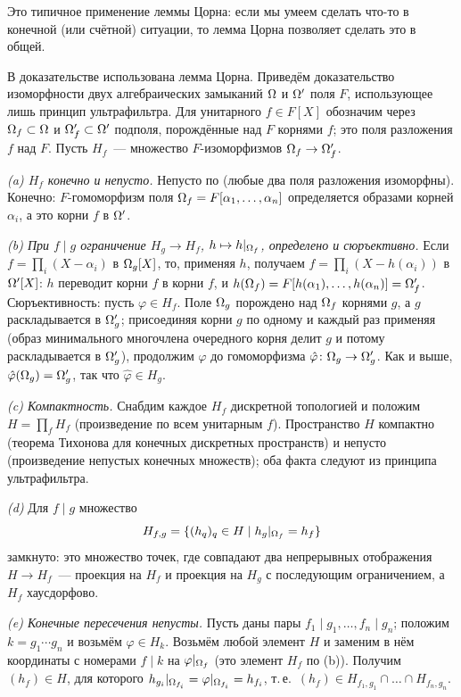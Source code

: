 Это типичное применение леммы Цорна: если мы умеем сделать что-то в конечной (или счётной) ситуации, то лемма Цорна
позволяет сделать это в общей.

\begin{remark}[6.7]
В доказательстве  использована лемма Цорна. Приведём доказательство изоморфности двух алгебраических замыканий
$\Omega$ и $\Omega'$ поля $F$, использующее лишь принцип ультрафильтра. Для унитарного $f\in F[X]$ обозначим через
$\Omega_f\subset\Omega$ и $\Omega'_f\subset\Omega'$ подполя, порождённые над $F$ корнями $f$; это поля разложения $f$ над $F$. Пусть
$H_f$~--- множество $F$-изоморфизмов $\Omega_f\to\Omega'_f$.

\emph{(a) $H_f$ конечно и непусто.} Непусто по  (любые два поля разложения изоморфны). Конечно: $F$-гомоморфизм
поля $\Omega_f=F[\alpha_1,\dots,\alpha_n]$ определяется образами корней $\alpha_i$, а это корни $f$ в $\Omega'$.

\emph{(b) При $f\mid g$ ограничение $H_g\to H_f$, $h\mapsto h|_{\Omega_f}$, определено и сюръективно.} Если
$f=\prod_i(X-\alpha_i)$ в $\Omega_g[X]$, то, применяя $h$, получаем $f=\prod_i(X-h(\alpha_i))$ в $\Omega'[X]$: $h$ переводит
корни $f$ в корни $f$, и $h(\Omega_f)=F[h(\alpha_1),\dots,h(\alpha_n)]=\Omega'_f$. Сюръективность: пусть $\varphi\in H_f$. Поле
$\Omega_g$ порождено над $\Omega_f$ корнями $g$, а $g$ раскладывается в $\Omega'_g$; присоединяя корни $g$ по одному и каждый
раз применяя  (образ минимального многочлена очередного корня делит $g$ и потому раскладывается в $\Omega'_g$), продолжим
$\varphi$ до гомоморфизма $\hat\varphi\colon\Omega_g\to\Omega'_g$. Как и выше, $\hat\varphi(\Omega_g)=\Omega'_g$, так что
$\hat\varphi\in H_g$.

\emph{(c) Компактность.} Снабдим каждое $H_f$ дискретной топологией и положим $H=\prod_fH_f$ (произведение по всем
унитарным $f$). Пространство $H$ компактно (теорема Тихонова для конечных дискретных пространств) и непусто (произведение
непустых конечных множеств); оба факта следуют из принципа ультрафильтра.

\emph{(d)} Для $f\mid g$ множество
\[
H_{f,g}=\{(h_q)_q\in H\mid h_g|_{\Omega_f}=h_f\}
\]
замкнуто: это множество точек, где совпадают два непрерывных отображения $H\to H_f$~--- проекция на $H_f$ и проекция на $H_g$ с
последующим ограничением, а $H_f$ хаусдорфово.

\emph{(e) Конечные пересечения непусты.} Пусть даны пары $f_1\mid g_1,\dots,f_n\mid g_n$; положим $k=g_1\cdots g_n$ и
возьмём $\varphi\in H_k$. Возьмём любой элемент $H$ и заменим в нём координаты с номерами $f\mid k$ на
$\varphi|_{\Omega_f}$ (это элемент $H_f$ по (b)). Получим $(h_f)\in H$, для которого $h_{g_i}|_{\Omega_{f_i}}=
\varphi|_{\Omega_{f_i}}=h_{f_i}$, т.\,е.\ $(h_f)\in H_{f_1,g_1}\cap\dots\cap H_{f_n,g_n}$.


\end{remark}

